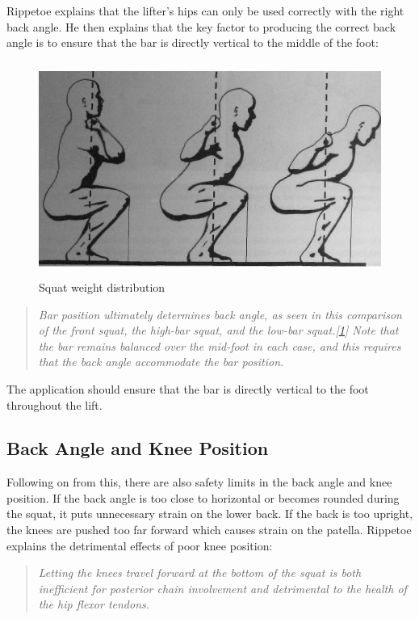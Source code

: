 Rippetoe explains that the lifter's hips can only be used correctly with the right back angle. He then explains that the key factor to producing the correct back angle is to ensure that the bar is directly vertical to the middle of the foot:

\begin{figure}[H]
    \centering
	\includegraphics[height=7cm]{squat/images/rippetoe_weight_distro}
\caption{Squat weight distribution}
\label{fig:rippetoe_weight}
\end{figure}

\begin{quote}
\emph{Bar position ultimately determines back angle, as seen in this comparison of the front squat, the high-bar squat, and the low-bar squat.[\ref{fig:rippetoe_weight}] Note that the bar remains balanced over the mid-foot in each case, and this requires that the back angle accommodate the bar position.}
\end{quote}

The application should ensure that the bar is directly vertical to the foot throughout the lift.

\subsection{Back Angle and Knee Position}

Following on from this, there are also safety limits in the back angle and knee position. If the back angle is too close to horizontal or becomes rounded during the squat, it puts unnecessary strain on the lower back. If the back is too upright, the knees are pushed too far forward which causes strain on the patella. Rippetoe explains the detrimental effects of poor knee position:

\begin{quote}
\emph{Letting the knees travel forward at the bottom of the squat is both inefficient for posterior chain involvement and detrimental to the health of the hip flexor tendons.}
\end{quote}

